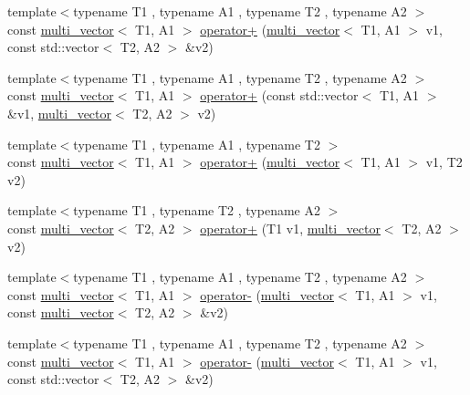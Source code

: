 \begin{DoxyCompactItemize}
\item 
{\footnotesize template$<$typename T1 , typename A1 , typename T2 , typename A2 $>$ }\\const \hyperlink{classIceBRG_1_1multi__vector}{multi\-\_\-vector}$<$ T1, A1 $>$ \hyperlink{namespaceIceBRG_aef9c10918e088bb2fc977df06ce504fc}{operator+} (\hyperlink{classIceBRG_1_1multi__vector}{multi\-\_\-vector}$<$ T1, A1 $>$ v1, const std\-::vector$<$ T2, A2 $>$ \&v2)
\item 
{\footnotesize template$<$typename T1 , typename A1 , typename T2 , typename A2 $>$ }\\const \hyperlink{classIceBRG_1_1multi__vector}{multi\-\_\-vector}$<$ T1, A1 $>$ \hyperlink{namespaceIceBRG_a620df17dfe0302262ba3d345ea47fc35}{operator+} (const std\-::vector$<$ T1, A1 $>$ \&v1, \hyperlink{classIceBRG_1_1multi__vector}{multi\-\_\-vector}$<$ T2, A2 $>$ v2)
\item 
{\footnotesize template$<$typename T1 , typename A1 , typename T2 $>$ }\\const \hyperlink{classIceBRG_1_1multi__vector}{multi\-\_\-vector}$<$ T1, A1 $>$ \hyperlink{namespaceIceBRG_a51bf8f08ec7aacd6315b72d860fc29f4}{operator+} (\hyperlink{classIceBRG_1_1multi__vector}{multi\-\_\-vector}$<$ T1, A1 $>$ v1, T2 v2)
\item 
{\footnotesize template$<$typename T1 , typename T2 , typename A2 $>$ }\\const \hyperlink{classIceBRG_1_1multi__vector}{multi\-\_\-vector}$<$ T2, A2 $>$ \hyperlink{namespaceIceBRG_ac814fa6496297941b5cd2a3eee09942f}{operator+} (T1 v1, \hyperlink{classIceBRG_1_1multi__vector}{multi\-\_\-vector}$<$ T2, A2 $>$ v2)
\item 
{\footnotesize template$<$typename T1 , typename A1 , typename T2 , typename A2 $>$ }\\const \hyperlink{classIceBRG_1_1multi__vector}{multi\-\_\-vector}$<$ T1, A1 $>$ \hyperlink{namespaceIceBRG_a1efdf0e26382c2842a20882b4d6ea88b}{operator-\/} (\hyperlink{classIceBRG_1_1multi__vector}{multi\-\_\-vector}$<$ T1, A1 $>$ v1, const \hyperlink{classIceBRG_1_1multi__vector}{multi\-\_\-vector}$<$ T2, A2 $>$ \&v2)
\item 
{\footnotesize template$<$typename T1 , typename A1 , typename T2 , typename A2 $>$ }\\const \hyperlink{classIceBRG_1_1multi__vector}{multi\-\_\-vector}$<$ T1, A1 $>$ \hyperlink{namespaceIceBRG_ad19694786b76b7fa8b31f7ecca068067}{operator-\/} (\hyperlink{classIceBRG_1_1multi__vector}{multi\-\_\-vector}$<$ T1, A1 $>$ v1, const std\-::vector$<$ T2, A2 $>$ \&v2)

\end{DoxyCompactItemize}
